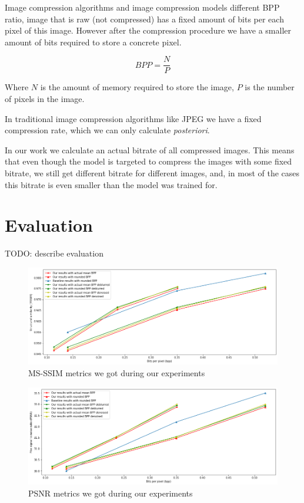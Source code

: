 Image compression algorithms and image compression models different BPP ratio, image that is raw (not compressed) has a fixed amount of bits per each pixel of this image. However after  the compression procedure we have a smaller amount of bits required to store a concrete pixel.

\begin{equation}
    \label{eq:bpp}
    \mathit{BPP} = \frac{N}{P}
\end{equation}

Where $N$ is the amount of memory required to store the image, $P$ is the number of pixels in the image.

In traditional image compression algorithms like JPEG we have a fixed compression rate, which we can only calculate \textit{posteriori}.

In our work we calculate an actual bitrate of all compressed images. This means that even though the model is targeted to compress the images with some fixed bitrate, we still get different bitrate for different images, and, in most of the cases this bitrate is even smaller than the model was trained for.

\section{Evaluation}

TODO: describe evaluation

\begin{figure}[!ht]
    \centering
    \includegraphics[width=\textwidth]{figure/mssim.png}
    \caption{MS-SSIM metrics we got during our experiments}
    \label{mssim}
\end{figure}

\begin{figure}[!ht]
    \centering
    \includegraphics[width=\textwidth]{figure/psnr.png}
    \caption{PSNR metrics we got during our experiments}
    \label{psnr}
\end{figure}

